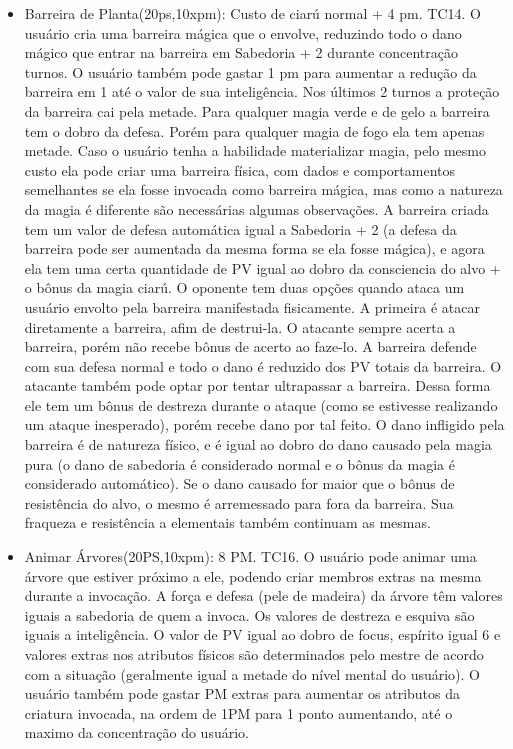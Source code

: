 \begin{itemize}
	\item Barreira de Planta(20ps,10xpm): Custo de ciarú normal + 4 pm. TC14.\newline
O usuário cria uma barreira mágica que o envolve, reduzindo todo o dano mágico que entrar na barreira em Sabedoria + 2 durante concentração turnos. O usuário também pode gastar 1 pm para aumentar a redução da barreira em 1 até o valor de sua inteligência. Nos últimos 2 turnos a proteção da barreira cai pela metade. Para qualquer magia verde e de gelo a barreira tem o dobro da defesa. Porém para qualquer magia de fogo ela tem apenas metade. Caso o usuário tenha a habilidade materializar magia, pelo mesmo custo ela pode criar uma barreira física, com dados e comportamentos semelhantes se ela fosse invocada como barreira mágica, mas como a natureza da magia é diferente são necessárias algumas observações. A barreira criada tem um valor de defesa automática igual a Sabedoria + 2 (a defesa da barreira pode ser aumentada da mesma forma se ela fosse mágica), e agora ela tem uma certa quantidade de PV igual ao dobro da consciencia do alvo + o bônus da magia ciarú. O oponente tem duas opções quando ataca um usuário envolto pela barreira manifestada fisicamente. A primeira é atacar diretamente a barreira, afim de destrui-la. O atacante sempre acerta a barreira, porém não recebe bônus de acerto ao faze-lo. A barreira defende com sua defesa normal e todo o dano é reduzido dos PV totais da barreira. O atacante também pode optar por tentar ultrapassar a barreira. Dessa forma ele tem um bônus de destreza durante o ataque (como se estivesse realizando um ataque inesperado), porém recebe dano por tal feito. O dano infligido pela barreira é de natureza físico, e é igual ao dobro do dano causado pela magia pura (o dano de sabedoria é considerado normal e o bônus da magia é considerado automático). Se o dano causado for maior que o bônus de resistência do alvo, o mesmo é arremessado para fora da barreira. Sua fraqueza e resistência a elementais também continuam as mesmas. 

	\item Animar Árvores(20PS,10xpm): 8 PM. TC16.\newline
O usuário pode animar uma árvore que estiver próximo a ele, podendo criar membros extras na mesma durante a invocação. A força e defesa (pele de madeira) da árvore têm valores iguais a sabedoria de quem a invoca. Os valores de destreza e esquiva são iguais a inteligência. O valor de PV igual ao dobro de focus, espírito igual 6 e valores extras nos atributos físicos são determinados pelo mestre de acordo com a situação (geralmente igual a metade do nível mental do usuário). O usuário também pode gastar PM extras para aumentar os atributos da criatura invocada, na ordem de 1PM para 1 ponto aumentando, até o maximo da concentração do usuário.


\end{itemize}
